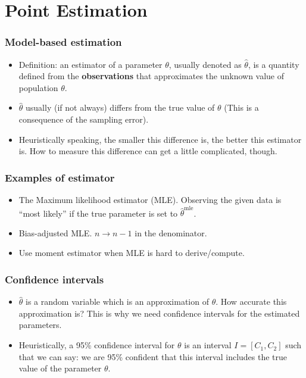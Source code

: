 \section{Point Estimation}

\begin{frame}
  \frametitle{Model-based estimation}
  \begin{itemize}
  \item Definition: an estimator of a parameter $\theta$, usually
    denoted as $\hat{\theta}$, is a quantity defined from the
    \textbf{observations} that \alert{approximates} the unknown value
    of population $\theta$.
  \item $\hat{\theta}$ usually (if not always) differs from the true
    value of $\theta$ (This is a consequence of the sampling
    error).
  \item Heuristically speaking, the smaller this difference is, the
    better this estimator is. How to measure this \alert{difference}
    can get a little complicated, though.
  \end{itemize}
\end{frame}

\begin{frame}
  \frametitle{Examples of estimator}
  \begin{itemize}
  \item The Maximum likelihood estimator (MLE).  Observing the given
    data is ``most likely'' if the true parameter is set to
    $\hat{\theta}^{\mathrm{mle}}$.
  \item Bias-adjusted MLE. $n \to n-1$ in the denominator.
  \item Use moment estimator when MLE is hard to derive/compute.
  \end{itemize}
\end{frame}

\begin{frame}
  \frametitle{Confidence intervals}
  \begin{itemize}
  \item $\hat{\theta}$ is a \alert{random variable} which is an
    approximation of $\theta$. How accurate this approximation is?
    This is why we need confidence intervals for the estimated
    parameters.
  \item Heuristically, a 95\% confidence interval for $\theta$ is an
    interval $I = [C_{1}, C_{2}]$ such that we can say: we are 95\%
    confident that this interval includes the true value of the
    parameter $\theta$.
  \end{itemize}
\end{frame}

